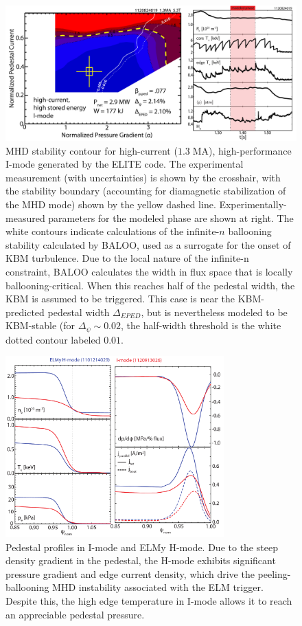 \documentclass[12pt,floatfix,showpacs]{revtex4-1}
\begin{document}
\begin{figure}[ht]
 \includegraphics[width=\textwidth]{pdfgraphics/1120824019_ELITE_stitch_v2.pdf}
 \caption{MHD stability contour for high-current ($1.3 \;\mbox{MA}$), high-performance I-mode generated by the ELITE code.  The experimental measurement (with uncertainties) is shown by the crosshair, with the stability boundary (accounting for diamagnetic stabilization of the MHD mode) shown by the yellow dashed line.  Experimentally-measured parameters for the modeled phase are shown at right.  The white contours indicate calculations of the infinite-$n$ ballooning stability calculated by BALOO, used as a surrogate for the onset of KBM turbulence.  Due to the local nature of the infinite-n constraint, BALOO calculates the width in flux space that is locally ballooning-critical.  When this reaches half of the pedestal width, the KBM is assumed to be triggered. This case is near the KBM-predicted pedestal width $\Delta_{EPED}$, but is nevertheless modeled to be KBM-stable (for $\Delta_\psi \sim 0.02$, the half-width threshold is the white dotted contour labeled $0.01$.}
 \label{fig:elite_1120824019}
\end{figure}

\begin{figure}[ht]
 \includegraphics[width=0.75\textwidth]{pdfgraphics/prof_elmy_imode.pdf}
 \caption{Pedestal profiles in I-mode and ELMy H-mode. Due to the steep density gradient in the pedestal, the H-mode exhibits significant pressure gradient and edge current density, which drive the peeling-ballooning MHD instability associated with the ELM trigger. Despite this, the high edge temperature in I-mode allows it to reach an appreciable pedestal pressure.}
 \label{fig:prof_elmy_imode}
\end{figure}
\end{document}
